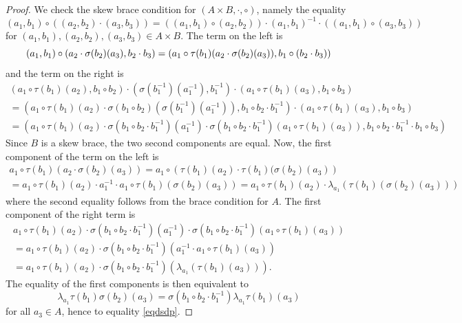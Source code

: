 \documentclass[12pt]{article}
\theoremstyle{definition}
\begin{document}
	\begin{proof}
		We check the skew brace condition for $(A\times B, \cdot,\circ)$, namely the equality
		$$(a_1,b_1)\circ \left( (a_2,b_2) \cdot (a_3,b_3) \right) = \left( (a_1,b_1) \circ (a_2,b_2) \right) \cdot (a_1,b_1)^{-1} \cdot \left( (a_1,b_1)\circ (a_3,b_3) \right)$$
		for $(a_1,b_1), (a_2,b_2), (a_3,b_3) \in A\times B$. The term on the left is
		$$ (a_1,b_1)\circ (a_2\cdot \sigma(b_2)(a_3),b_2\cdot b_3) \\
		= (a_1 \circ \tau(b_1)(a_2\cdot \sigma(b_2)(a_3)),b_1 \circ ( b_2\cdot b_3))$$
		and the term on the right is
		$$\begin{array}{l} 
		(a_1 \circ \tau(b_1)(a_2),b_1\circ b_2) \cdot (\sigma(b_1^{-1})(a_1^{-1}),b_1^{-1})\cdot(a_1 \circ \tau(b_1)(a_3),b_1\circ b_3)\\
		=(a_1 \circ \tau(b_1)(a_2)\cdot \sigma(b_1\circ b_2)(\sigma(b_1^{-1})(a_1^{-1})),b_1\circ b_2 \cdot b_1^{-1})\cdot(a_1 \circ \tau(b_1)(a_3),b_1\circ b_3)\\
		=(a_1 \circ \tau(b_1)(a_2)\cdot \sigma(b_1\circ b_2 \cdot b_1^{-1})(a_1^{-1})\cdot \sigma(b_1\circ b_2 \cdot b_1^{-1})(a_1 \circ \tau(b_1)(a_3)),b_1\circ b_2 \cdot b_1^{-1} \cdot b_1\circ b_3)
		\end{array}
		$$
		Since $B$ is a skew brace, the two second components are equal. Now, the first component of the term on the left is
		$$\begin{array}{l} a_1 \circ \tau(b_1)(a_2\cdot \sigma(b_2)(a_3))=a_1 \circ \left(\tau(b_1)(a_2) \cdot \tau(b_1)(\sigma(b_2)(a_3)\right)\\ 
		=a_1 \circ \tau(b_1)(a_2)\cdot a_1^{-1} \cdot a_1  \circ \tau(b_1)(\sigma(b_2)(a_3))=
		a_1 \circ \tau(b_1)(a_2)\cdot \lambda_{a_1}(\tau(b_1)(\sigma(b_2)(a_3)))
		\end{array}
		$$
		where the second equality follows from the brace condition for $A$. The first component of the right term is
		$$\begin{array}{l} a_1 \circ \tau(b_1)(a_2)\cdot \sigma(b_1\circ b_2 \cdot b_1^{-1})(a_1^{-1})\cdot \sigma(b_1\circ b_2 \cdot b_1^{-1})(a_1 \circ \tau(b_1)(a_3)) \\ = a_1 \circ \tau(b_1)(a_2)\cdot \sigma(b_1\circ b_2 \cdot b_1^{-1})(a_1^{-1}\cdot a_1 \circ \tau(b_1)(a_3))
		\\= a_1 \circ \tau(b_1)(a_2)\cdot \sigma(b_1\circ b_2 \cdot b_1^{-1})(\lambda_{a_1}( \tau(b_1)(a_3))).
		\end{array}
		$$
		The equality of the first components is then equivalent to
		$$\lambda_{a_1}\tau(b_1)\sigma(b_2)(a_3)=\sigma(b_1\circ b_2 \cdot b_1^{-1})\lambda_{a_1}\tau(b_1)(a_3)$$ for all $a_3\in A$, hence to equality \eqref{eqdsdp}.
	\end{proof}
\end{document}

